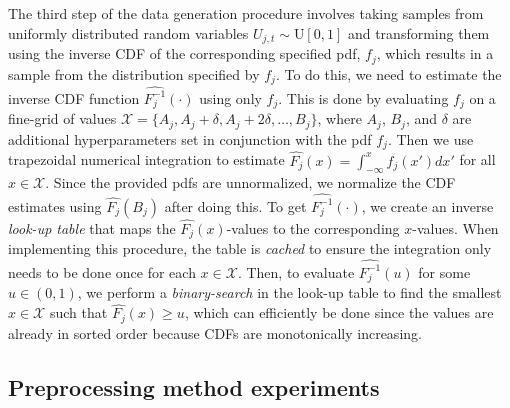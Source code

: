 \documentclass{statsmsc}
\begin{document}
{The third step of the data generation procedure involves taking samples from
uniformly distributed random variables $U_{j,t} \sim \textrm{U}[0,1]$ and transforming them
using the inverse \ac{CDF} of the corresponding specified \ac{pdf}, $f_j$, which results in
a sample from the distribution specified by $f_j$. To do this, we need to estimate the inverse
\ac{CDF} function $\widehat{F^{-1}_j}(\cdot)$ using only $f_j$. This is done by evaluating
$f_j$ on a fine-grid of values $\mathcal{X}=\{A_j,A_j+\delta,A_j+2\delta,\dots,B_j\}$, where
$A_j$, $B_j$, and $\delta$ are additional
hyperparameters set in conjunction with the \ac{pdf} $f_j$.
Then we use trapezoidal numerical integration \citep{num_anal} to estimate
$\widehat{F_j}(x)=\int_{-\infty}^x f_j(x') dx'$  for all $x \in \mathcal{X}$. Since the provided
\acp{pdf} are unnormalized, we normalize the \ac{CDF} estimates using $\widehat{F_j}(B_j)$
after doing this.
To get $\widehat{F_j^{-1}}(\cdot)$, we create an inverse \textit{look-up table} that maps the
$\widehat{F_j}(x)$-values to the corresponding $x$-values. When implementing this procedure,
the table is \textit{cached} to ensure the integration only needs to be done
once for each $x \in \mathcal{X}$. Then, to evaluate $\widehat{F^{-1}_j}(u)$ for some $u \in (0,1)$,
we perform a \textit{binary-search} in the look-up table to find the smallest $x \in \mathcal{X}$ such that
$\widehat{F_j}(x) \geq u$, which can efficiently be done since the values are already in sorted order
because \acp{CDF} are monotonically increasing.



\subsection{Preprocessing method experiments}%
\label{sub:Preprocessing method experiments}

}
\end{document}
